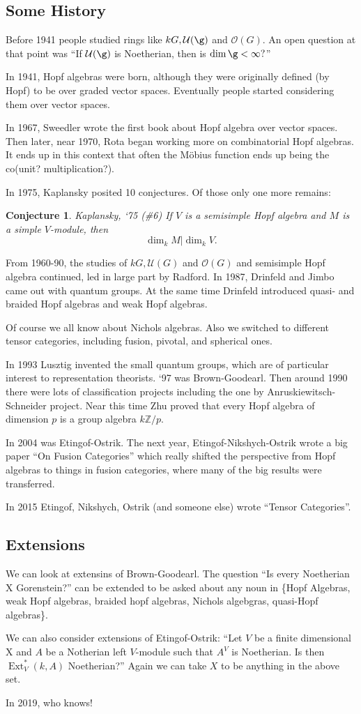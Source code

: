 \documentclass[12pt]{article}
\theoremstyle{break}
\theoremstyle{nonumberbreak}
\theoremstyle{changebreak}
\theoremstyle{break}
\theoremstyle{nonumberbreak}
\theoremstyle{nonumberplain}
\newtheorem{conj}{Conjecture}
\theoremstyle{change}
\newcommand*{\Z}{
\mathbb{Z}
}
\DeclareMathOperator{\Ext}{Ext}
\begin{document}
\subsection{Some History}
Before 1941 people studied rings like $kG, \mathcal U(\g)$ and $\mathcal O(G)$. An open question at that
point was ``If $\mathcal U(\g)$ is Noetherian, then is $\dim \g<\infty?$''

In 1941, Hopf algebras were born, although they were originally defined (by Hopf) to be over graded
vector spaces. Eventually people started considering them over vector spaces.

In 1967, Sweedler wrote the first book about Hopf algebra over vector spaces. Then later, near 1970,
Rota began working more on combinatorial Hopf algebras. It ends up in this context that often the 
M\"obius function ends up being the co(unit? multiplication?).

In 1975, Kaplansky posited 10 conjectures. Of those only one more remains:
\begin{conj}{Kaplansky, `75 (\#6)}
	If $V$ is a semisimple Hopf algebra and $M$ is a simple $V$-module, then 
	\[\dim_kM|\dim_kV.\]
\end{conj}

From 1960-90, the studies of $kG, \mathcal U(G)$ and $\mathcal O(G)$ and semisimple Hopf algebra continued,
led in large part by Radford. In 1987, Drinfeld and Jimbo came out with quantum groups.
At the same time Drinfeld introduced quasi- and braided Hopf algebras and weak Hopf algebras.

Of course we all know about Nichols algebras. Also we switched to different tensor categories, including
fusion, pivotal, and spherical ones.

In 1993 Lusztig invented the small quantum groups, which are of particular interest to representation theorists.
`97 was Brown-Goodearl. Then around 1990 there were lots of classification projects including
the one by Anruskiewitsch-Schneider project. Near this time Zhu proved that every Hopf algebra of dimension $p$
is a group algebra $k\Z/p$. 

In 2004 was Etingof-Ostrik. The next year, Etingof-Nikshych-Ostrik wrote a big paper ``On Fusion Categories''
which really shifted the perspective from Hopf algebras to things in fusion categories, where many of the big
results were transferred.

In 2015 Etingof, Nikshych, Ostrik (and someone else) wrote ``Tensor Categories''.

\subsection{Extensions}
We can look at extensins of Brown-Goodearl. The question ``Is every Noetherian X Gorenstein?'' can be extended to be asked about any noun 
in \{Hopf Algebras, weak Hopf algebras, braided hopf algebras, Nichols algebgras, quasi-Hopf algebras\}.

We can also consider extensions of Etingof-Ostrik: ``Let $V$ be a finite dimensional X and $A$ be a 
Notherian left $V$-module such that $A^V$ is Noetherian. Is then $\Ext_V^*(k,A)$ Noetherian?'' Again
we can take $X$ to be anything in the above set.

In 2019, who knows!
\end{document}
